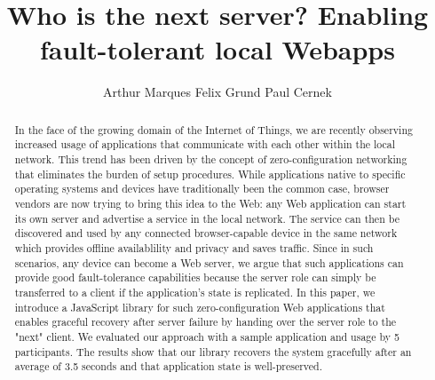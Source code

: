 \documentclass[sigconf]{acmart}
\title{Who is the next server? Enabling fault-tolerant local Webapps}
\author{Arthur Marques \qquad Felix Grund \qquad Paul Cernek}
\affiliation{
    \institution{University of British Columbia}
    \city{Vancouver} 
    \state{BC} 
  }
\begin{document}
\maketitle

\begin{abstract}
In the face of the growing domain of the Internet of Things, we are recently observing increased usage of applications that communicate with each other within the local network. This trend has been driven by the concept of zero-configuration networking that eliminates the burden of setup procedures. While applications native to specific operating systems and devices have traditionally been the common case, browser vendors are now trying to bring this idea to the Web: any Web application can start its own server and advertise a service in the local network. The service can then be discovered and used by any connected browser-capable device in the same network which provides offline availablility and privacy and saves traffic. Since in such scenarios, any device can become a Web server, we argue that such applications can provide good fault-tolerance capabilities because the server role can simply be transferred to a client if the application's state is replicated. In this paper, we introduce a JavaScript library for such zero-configuration Web applications that enables graceful recovery after server failure by handing over the server role to the "next" client. We evaluated our approach with a sample application and usage by 5 participants. The results show that our library recovers the system gracefully after an average of 3.5 seconds and that application state is well-preserved.
\end{abstract}













\end{document}
